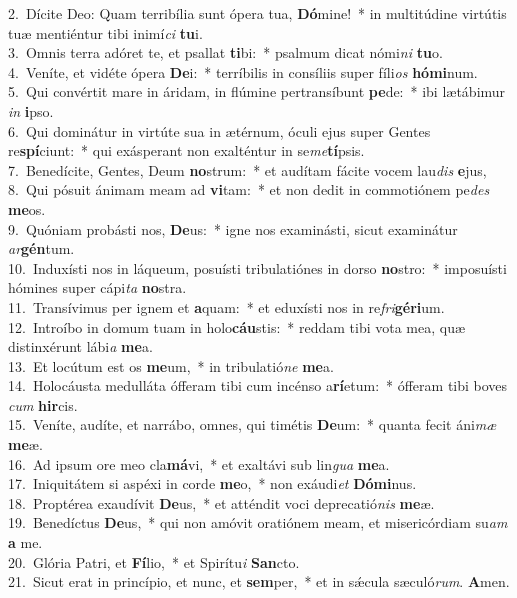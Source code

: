 {2.~}Dícite Deo: Quam terribília sunt ópera tua, \textbf{Dó}mine!~* in multitúdine virtútis tuæ mentiéntur tibi inimí\textit{ci} \textbf{tu}i.\\
{3.~}Omnis terra adóret te, et psallat \textbf{ti}bi:~* psalmum dicat nómi\textit{ni} \textbf{tu}o.\\
{4.~}Veníte, et vidéte ópera \textbf{De}i:~* terríbilis in consíliis super fíli\textit{os} \textbf{hó}\textbf{mi}num.\\
{5.~}Qui convértit mare in áridam, in flúmine pertransíbunt \textbf{pe}de:~* ibi lætábimur \textit{in} \textbf{i}pso.\\
{6.~}Qui dominátur in virtúte sua in ætérnum, óculi ejus super Gentes re\textbf{spí}ciunt:~* qui exásperant non exalténtur in se\textit{me}\textbf{tí}psis.\\
{7.~}Benedícite, Gentes, Deum \textbf{no}strum:~* et audítam fácite vocem lau\textit{dis} \textbf{e}jus,\\
{8.~}Qui pósuit ánimam meam ad \textbf{vi}tam:~* et non dedit in commotiónem pe\textit{des} \textbf{me}os.\\
{9.~}Quóniam probásti nos, \textbf{De}us:~* igne nos examinásti, sicut examinátur \textit{ar}\textbf{gén}tum.\\
{10.~}Induxísti nos in láqueum, posuísti tribulatiónes in dorso \textbf{no}stro:~* imposuísti hómines super cápi\textit{ta} \textbf{no}stra.\\
{11.~}Transívimus per ignem et \textbf{a}quam:~* et eduxísti nos in re\textit{fri}\textbf{gé}\textbf{ri}um.\\
{12.~}Introíbo in domum tuam in holo\textbf{cáu}stis:~* reddam tibi vota mea, quæ distinxérunt lábi\textit{a} \textbf{me}a.\\
{13.~}Et locútum est os \textbf{me}um,~* in tribulatió\textit{ne} \textbf{me}a.\\
{14.~}Holocáusta medulláta ófferam tibi cum incénso a\textbf{rí}etum:~* ófferam tibi boves \textit{cum} \textbf{hir}cis.\\
{15.~}Veníte, audíte, et narrábo, omnes, qui timétis \textbf{De}um:~* quanta fecit áni\textit{mæ} \textbf{me}æ.\\
{16.~}Ad ipsum ore meo cla\textbf{má}vi,~* et exaltávi sub lin\textit{gua} \textbf{me}a.\\
{17.~}Iniquitátem si aspéxi in corde \textbf{me}o,~* non exáudi\textit{et} \textbf{Dó}\textbf{mi}nus.\\
{18.~}Proptérea exaudívit \textbf{De}us,~* et atténdit voci deprecatió\textit{nis} \textbf{me}æ.\\
{19.~}Benedíctus \textbf{De}us,~* qui non amóvit oratiónem meam, et misericórdiam su\textit{am} \textbf{a} me.\\
{20.~}Glória Patri, et \textbf{Fí}lio,~* et Spirítu\textit{i} \textbf{San}cto.\\
{21.~}Sicut erat in princípio, et nunc, et \textbf{sem}per,~* et in sǽcula sæculó\textit{rum}. \textbf{A}men.\\
